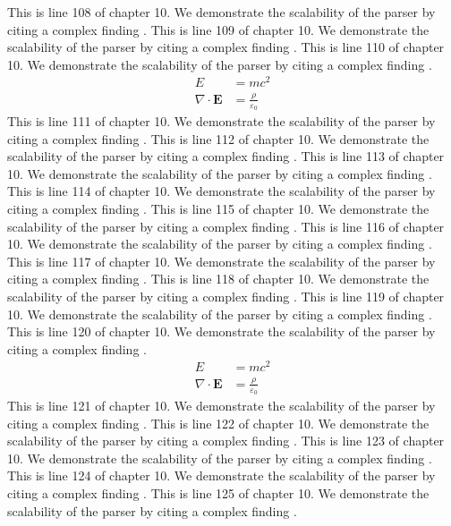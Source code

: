 This is line 108 of chapter 10. We demonstrate the scalability of the parser by citing a complex finding \cite{ref10_108}.
This is line 109 of chapter 10. We demonstrate the scalability of the parser by citing a complex finding \cite{ref10_109}.
This is line 110 of chapter 10. We demonstrate the scalability of the parser by citing a complex finding \cite{ref10_110}.
\begin{align*}
  E &= mc^2 \\
  \nabla \cdot \mathbf{E} &= \frac{\rho}{\varepsilon_0}
\end{align*}
This is line 111 of chapter 10. We demonstrate the scalability of the parser by citing a complex finding \cite{ref10_111}.
This is line 112 of chapter 10. We demonstrate the scalability of the parser by citing a complex finding \cite{ref10_112}.
This is line 113 of chapter 10. We demonstrate the scalability of the parser by citing a complex finding \cite{ref10_113}.
This is line 114 of chapter 10. We demonstrate the scalability of the parser by citing a complex finding \cite{ref10_114}.
This is line 115 of chapter 10. We demonstrate the scalability of the parser by citing a complex finding \cite{ref10_115}.
This is line 116 of chapter 10. We demonstrate the scalability of the parser by citing a complex finding \cite{ref10_116}.
This is line 117 of chapter 10. We demonstrate the scalability of the parser by citing a complex finding \cite{ref10_117}.
This is line 118 of chapter 10. We demonstrate the scalability of the parser by citing a complex finding \cite{ref10_118}.
This is line 119 of chapter 10. We demonstrate the scalability of the parser by citing a complex finding \cite{ref10_119}.
This is line 120 of chapter 10. We demonstrate the scalability of the parser by citing a complex finding \cite{ref10_120}.
\begin{align*}
  E &= mc^2 \\
  \nabla \cdot \mathbf{E} &= \frac{\rho}{\varepsilon_0}
\end{align*}
This is line 121 of chapter 10. We demonstrate the scalability of the parser by citing a complex finding \cite{ref10_121}.
This is line 122 of chapter 10. We demonstrate the scalability of the parser by citing a complex finding \cite{ref10_122}.
This is line 123 of chapter 10. We demonstrate the scalability of the parser by citing a complex finding \cite{ref10_123}.
This is line 124 of chapter 10. We demonstrate the scalability of the parser by citing a complex finding \cite{ref10_124}.
This is line 125 of chapter 10. We demonstrate the scalability of the parser by citing a complex finding \cite{ref10_125}.
